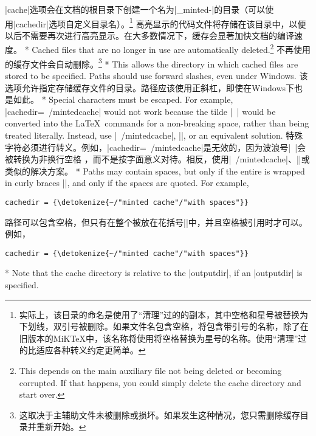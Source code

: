 \begin{paracol}{2}
\switchcolumn
|cache|选项会在文档的根目录下创建一个名为|_minted-|的目录（可以使用|cachedir|选项自定义目录名）。\footnote{实际上，该目录的命名是使用了“清理”过的的副本，其中空格和星号被替换为下划线，双引号被删除。如果文件名包含空格，\texttt{\string\jobname}将包含带引号的名称，除了在旧版本的MiKTeX中，该名称将使用将空格替换为星号的名称。使用“清理”过的比适应各种转义约定更简单。} 高亮显示的代码文件将存储在该目录中，以便以后不需要再次进行高亮显示。在大多数情况下，缓存会显著加快文档的编译速度。
\switchcolumn[0]*%
Cached files that are no longer in use are automatically deleted.\footnote{This depends on the main auxiliary file not being deleted or becoming corrupted.  If that happens, you could simply delete the cache directory and start over.}
\switchcolumn
不再使用的缓存文件会自动删除。\footnote{这取决于主辅助文件未被删除或损坏。如果发生这种情况，您只需删除缓存目录并重新开始。}
\switchcolumn[0]*%
This allows the directory in which cached files are stored to be specified.  Paths should use forward slashes, even under Windows.
\switchcolumn
{}
该选项允许指定存储缓存文件的目录。路径应该使用正斜杠，即使在Windows下也是如此。
\switchcolumn[0]*%
Special characters must be escaped.  For example, |cachedir=~/mintedcache| would not work because the tilde |~| would be converted into the \LaTeX\ commands for a non-breaking space, rather than being treated literally.  Instead, use |\string~/mintedcache|, ||, or an equivalent solution.
\switchcolumn
特殊字符必须进行转义。例如，|cachedir=~/mintedcache|是无效的，因为波浪号|~|会被转换为非换行空格%
，而不是按字面意义对待。相反，使用|\string~/mintedcache|、||或类似的解决方案。
\switchcolumn[0]*%
Paths may contain spaces, but only if the entire  is wrapped in curly braces |{}|, and only if the spaces are quoted.  For example,
\begin{Verbatim}
cachedir = {\detokenize{~/"minted cache"/"with spaces"}}
\end{Verbatim}
\switchcolumn
路径可以包含空格，但只有在整个被放在花括号|{}|中，并且空格被引用时才可以。例如，
\begin{Verbatim}
cachedir = {\detokenize{~/"minted cache"/"with spaces"}}
\end{Verbatim}
\switchcolumn[0]*%
Note that the cache directory is relative to the |outputdir|, if an |outputdir| is specified.

\end{paracol}
